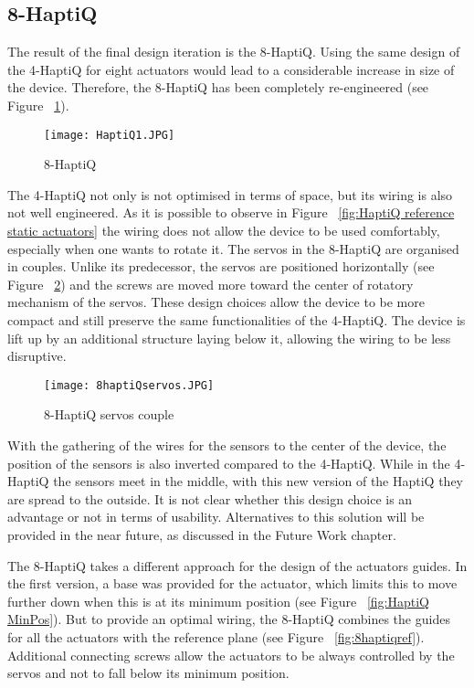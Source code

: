 \subsection{8-HaptiQ}
The result of the final design iteration is the 8-HaptiQ. Using the same design of the 4-HaptiQ for eight actuators would lead to a considerable increase in size of the device. Therefore, the 8-HaptiQ has been completely re-engineered (see Figure ~\ref{fig:8-HaptiQ}). 

\begin{figure}[H]
  \centering
  \texttt{[image: HaptiQ1.JPG]}
  \caption{8-HaptiQ}
  \label{fig:8-HaptiQ}
\end{figure}

The 4-HaptiQ not only is not optimised in terms of space, but its wiring is also not well engineered. As it is possible to observe in Figure ~\ref{fig:HaptiQ reference static actuators} the wiring does not allow the device to be used comfortably, especially when one wants to rotate it. 
The servos in the 8-HaptiQ are organised in couples. Unlike its predecessor, the servos are positioned horizontally (see Figure ~\ref{fig:8-HaptiQservos}) and the screws are moved more toward the center of rotatory mechanism of the servos. These design choices allow the device to be more compact and still preserve the same functionalities of the 4-HaptiQ. 
The device is lift up by an additional structure laying below it, allowing the wiring to be less disruptive. 

\begin{figure}[H]
  \centering
  \texttt{[image: 8haptiQservos.JPG]}
  \caption{8-HaptiQ servos couple}
  \label{fig:8-HaptiQservos}
\end{figure}

With the gathering of the wires for the sensors to the center of the device, the position of the sensors is also inverted compared to the 4-HaptiQ. While in the 4-HaptiQ the sensors meet in the middle, with this new version of the HaptiQ they are spread to the outside. It is not clear whether this design choice is an advantage or not in terms of usability. Alternatives to this solution will be provided in the near future, as discussed in the Future Work chapter.

The 8-HaptiQ takes a different approach for the design of the actuators guides. In the first version, a base was provided for the actuator, which limits this to move further down when this is at its minimum position (see Figure ~\ref{fig:HaptiQ MinPos}). But to provide an optimal wiring, the 8-HaptiQ combines the guides for all the actuators with the reference plane (see Figure ~\ref{fig:8haptiqref}). Additional connecting screws allow the actuators to be always controlled by the servos and not to fall below its minimum position. 

